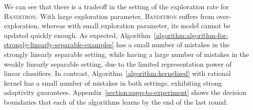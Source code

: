 We can see that there is a tradeoff in the setting of the exploration rate for
\textsc{Banditron}. With large exploration parameter, \textsc{Banditron} suffers
from over-exploration, whereas with small exploration parameter, its model
cannot be updated quickly enough. As expected,
Algorithm~\ref{algorithm:algorithm-for-strongly-linearly-separable-examples} has
a small number of mistakes in the strongly linearly separable setting, while
having a large number of mistakes in the weakly linearly separable setting, due
to the limited representation power of linear classifiers. In contrast,
Algorithm~\ref{algorithm:kernelized} with rational kernel has a small number of
mistakes in both settings, exhibiting strong adaptivity guarantees.
Appendix~\ref{section:supp-to-experiment} shows the decision boundaries that
each of the algorithms learns by the end of the last round.

